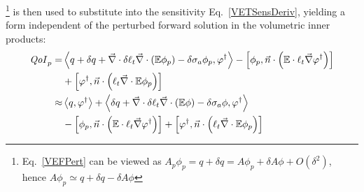 \documentclass[12pt]{report}
\newcommand{\bra}{\left\langle}
\newcommand{\ket}{\right\rangle}
\newcommand{\sbra}{\left[}
\newcommand{\sket}{\right]}
\renewcommand{\div}{\vec{\nabla} \cdot}
\newcommand{\grad}{\vec{\nabla}}
\newcommand{\vefadj}{\varphi^\dag}
\newcommand{\vn}{\vec{n}}
\newcommand{\Edd}{\mathbb{E}}
\newcommand{\siga}{\sigma_a}
\newcommand{\isigt}{\ell_t}
\newcommand{\scalSource}{q}
\newcommand{\qoi}{{\it QoI}\xspace}
\begin{document}
\footnote{Eq.~\eqref{VEFPert} can be viewed as $A_p \phi_p = q+\delta q = A \phi_p + \delta A \phi + O(\delta^2)$, hence $A \phi_p  \simeq  q+\delta q -\delta A \phi$} is then used to substitute into the sensitivity Eq.~\eqref{VETSensDeriv}, yielding a form independent of the perturbed forward solution in the volumetric inner products:
\begin{equation}
\label{QoIVETAdjNoBC}
\begin{split}
\qoi_p =& \bra \scalSource + \delta \scalSource + \div \delta \isigt \div \left( \Edd \phi_p \right) - \delta \siga \phi_p, \vefadj \ket - \sbra \phi_p, \vn \cdot \left(  \Edd \cdot \isigt \grad \vefadj \right) \sket \\ 
&+ \sbra \vefadj, \vn \cdot \left(  \isigt \div \Edd \phi_p \right) \sket \\
\approx & \bra q, \vefadj \ket  + \bra \delta \scalSource + \div \delta \isigt \div \left( \Edd \phi \right)  - \delta \siga \phi, \vefadj \ket \\
& - \sbra \phi_p, \vn \cdot \left(  \Edd \cdot \isigt \grad \vefadj \right) \sket + \sbra \vefadj, \vn \cdot \left(  \isigt \div \Edd \phi_p \right) \sket \\
\end{split}
\end{equation}
\end{document}
